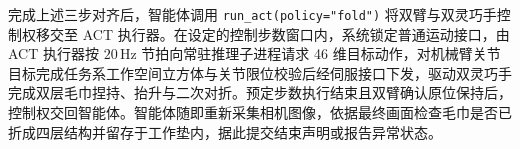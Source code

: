 完成上述三步对齐后，智能体调用 \texttt{run\_act(policy="fold")} 将双臂与双灵巧手控制权移交至 ACT 执行器。在设定的控制步数窗口内，系统锁定普通运动接口，由 ACT 执行器按 $20\,\mathrm{Hz}$ 节拍向常驻推理子进程请求 46 维目标动作，对机械臂关节目标完成任务系工作空间立方体与关节限位校验后经伺服接口下发，驱动双灵巧手完成双层毛巾捏持、抬升与二次对折。预定步数执行结束且双臂确认原位保持后，控制权交回智能体。智能体随即重新采集相机图像，依据最终画面检查毛巾是否已折成四层结构并留存于工作垫内，据此提交结束声明或报告异常状态。
